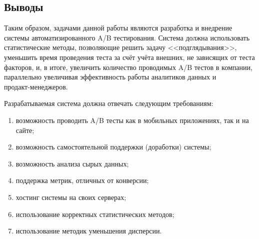 \documentclass[../document.tex]{subfiles}
\begin{document}
	\subsection{Выводы}
	\par Таким образом, задачами данной работы являются разработка и внедрение системы автоматизированного A/B тестирования. Система должна использовать статистические методы, позволяющие решить задачу <<подглядывания>>, уменьшить время проведения теста за счёт учёта внешних, не зависящих от теста факторов, и, в итоге, увеличить количество проводимых A/B тестов в компании, параллельно увеличивая эффективность работы аналитиков данных и \\продакт-менеджеров.
	\par Разрабатываемая система должна отвечать следующим требованиям:
	\begin{enumerate}
		\item возможность проводить A/B тесты как в мобильных приложениях, так и на сайте;
		\item возможность самостоятельной поддержки (доработки) системы;
		\item возможность анализа сырых данных;
		\item поддержка метрик, отличных от конверсии;
		\item хостинг системы на своих серверах;
		\item использование корректных статистических методов;
		\item использование методик уменьшения дисперсии.
	\end{enumerate}
\end{document}
